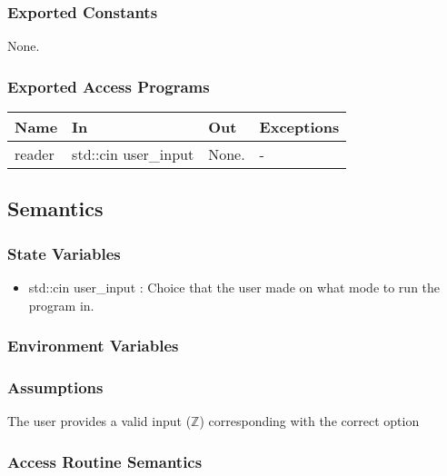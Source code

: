 \documentclass[12pt, titlepage]{article}
\begin{document}
\subsubsection{Exported Constants}

None.

\subsubsection{Exported Access Programs}

\begin{center}
\begin{tabular}{p{2cm} p{4cm} p{4cm} p{2cm}}
\hline
\textbf{Name} & \textbf{In} & \textbf{Out} & \textbf{Exceptions} \\
\hline
reader & std::cin user\_input  & None. & - \\
\hline
\end{tabular}
\end{center}

\subsection{Semantics}

\subsubsection{State Variables}

\begin{itemize}
  \item std::cin user\_input : Choice that the user made on what mode to run the program in.
\end{itemize}

\subsubsection{Environment Variables}


\subsubsection{Assumptions}

The user provides a valid input ($\mathbb{Z}$) corresponding with the correct option

\subsubsection{Access Routine Semantics}
\end{document}
